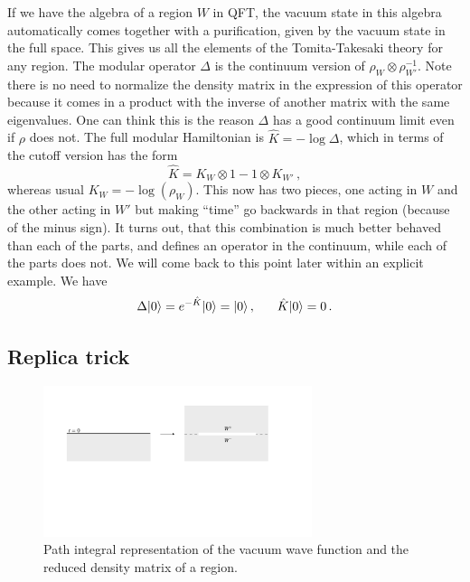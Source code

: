 \documentclass[12pt]{article}
\numberwithin{equation}{section}
\newcommand{\be}{\begin{equation}}
\newcommand{\ee}{\end{equation}}
\begin{document}
If we have the algebra of a region $W$ in QFT, the vacuum state in this algebra automatically comes together with a purification, given by the vacuum state in the full space. This gives us all the elements of the Tomita-Takesaki theory for any region. The modular operator $\Delta$ is the continuum version of $\rho_W\otimes \rho_{W'}^{-1}$. Note there is no need to normalize the density matrix in the expression of this operator because it comes in a product with the inverse of another matrix with the same eigenvalues. One can think this is the reason $\Delta$ has a good continuum limit even if $\rho$ does not. The full modular Hamiltonian is $\hat{K}=-\log \Delta$, which in terms of the cutoff version has the form
\be 
\hat{K}= K_W \otimes 1 - 1\otimes K_{W'}\,,\label{full}
\ee
whereas usual $K_{W}=-\log(\rho_W)$. This now has two pieces, one acting in $W$ and the other acting in $W'$ but making ``time'' go backwards in that region (because of the minus sign). It turns out, that this combination is much better behaved than each of the parts, and defines an operator in the continuum, while each of the parts does not.  We will come back to this point later within an explicit example. We have
\be
\Delta |0\rangle=e^{-\hat{K}} |0\rangle=|0\rangle\,,\hspace{.6cm}   \hat{K} |0\rangle=0\,. 
\ee
\subsection{Replica trick}
\begin{figure}[t]
\begin{center}  
\includegraphics[width=0.7\textwidth]{replica.pdf}
\captionsetup{width=0.9\textwidth}
\caption{Path integral representation of the vacuum wave function and the reduced density matrix of a region. }
\label{replica}
\end{center}  
\end{figure} 
\end{document}
